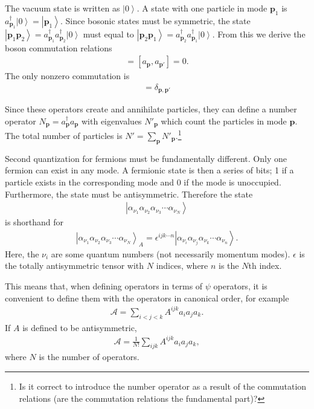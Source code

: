 \documentclass[12pt]{article} %
\renewcommand{\cal}{\mathcal}
\renewcommand{\th}[1]{\frac{1}{#1}}
\renewcommand{\d}{\delta}
\newcommand{\ket}[1]{\left|#1\right\rangle}
\begin{document}
The vacuum state is written as $\ket{0}$. A state with one particle in mode $\bm p_1$ is $a^\dagger_{\bm p_1}\ket{0} = \ket{\bm p_1}$. Since bosonic states must be symmetric, the state $\ket{\bm p_1\bm p_2} = a^\dag_{\bm p_1} a^\dag_{\bm p_2}\ket{0}$ must equal to $\ket{\bm p_2\bm p_1} = a^\dag_{\bm p_2} a^\dag_{\bm p_1}\ket{0}$. From this we derive the boson commutation relations
\begin{align}
[a^\dag_{\bm p}, a^\dag_{\bm p'}] = [a_{\bm p}, a_{\bm p'}]=0.
\end{align}
The only nonzero commutation is 
\begin{align}
[a_{\bm p},a^\dag_{\bm p'}] = \d_{\bm{p,p}'}
\end{align}

Since these operators create and annihilate particles, they can define a number operator $N_{\bm p} = a^\dagger_{\bm p}a_{\bm p}$ with eigenvalues $N'_{\bm p}$ which count the particles in mode $\bm p$. The total number of particles is $N' = \sum_{\bm p}N'_{\bm p}$.\footnote{Is it correct to introduce the number operator as a result of the commutation relations (are the commutation relations the fundamental part)?}

Second quantization for fermions must be fundamentally different. Only one fermion can exist in any mode. A fermionic state is then a series of bits; 1 if a particle exists in the corresponding mode and 0 if the mode is unoccupied. Furthermore, the state must be antisymmetric. Therefore the state
\begin{align}
\ket{\alpha_{\nu_1}\alpha_{\nu_2}\alpha_{\nu_3}\cdots\alpha_{\nu_N}}
\end{align}
is shorthand for 
\begin{align}
\ket{\alpha_{\nu_1}\alpha_{\nu_2}\alpha_{\nu_3}\cdots\alpha_{\nu_N}}_A = 
	\epsilon^{ijk\cdots n}\ket{\alpha_{\nu_i}\alpha_{\nu_j}\alpha_{\nu_k}\cdots
	\alpha_{\nu_n}}.
\end{align}
Here, the $\nu_i$ are some quantum numbers (not necessarily momentum modes). $\epsilon$ is the totally antisymmetric tensor with $N$ indices, where $n$ is the $N$th index.


This means that, when defining operators in terms of $\psi$ operators, it is convenient to define them with the operators in canonical order, for example
\begin{align}
\cal A = \sum_{i<j<k}A^{ijk}a_ia_ja_k.
\end{align}
If $A$ is defined to be antisymmetric, 
\begin{align}
\cal A = \th{N!}\sum_{ijk}A^{ijk}a_ia_ja_k,
\end{align}
where $N$ is the number of operators. 
\end{document}
